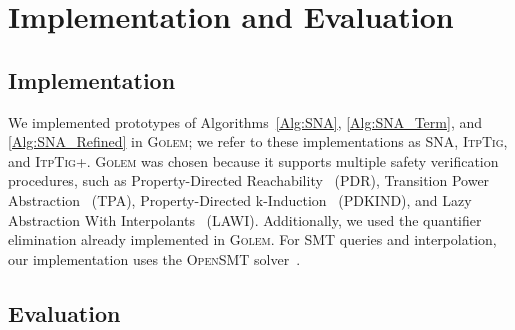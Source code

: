 \section{Implementation and Evaluation}
\label{Sec:Eval}


\newcommand{\golem}{\textsc{Golem}\xspace}
\newcommand{\opensmt}{\textsc{OpenSMT}\xspace}
\newcommand{\sna}{\textsc{SNA}\xspace}
\newcommand{\snaTerm}{\textsc{ItpTig}\xspace}
\newcommand{\snaOpt}{\textsc{ItpTig+}\xspace}
\newcommand{\LoAT}{\textsc{LoAT}\xspace}
\newcommand{\KoAT}{\textsc{KoAT}\xspace}
\newcommand{\Tt}{\textsc{T2}\xspace}

\subsection{Implementation}


We implemented prototypes of Algorithms~\ref{Alg:SNA}, \ref{Alg:SNA_Term}, and \ref{Alg:SNA_Refined} in \golem;
we refer to these implementations as \sna, \snaTerm, and \snaOpt.
\golem was chosen because it supports multiple safety verification procedures,
such as Property-Directed Reachability~\cite{DBLP:journals/fac/BradleyM08} (PDR), Transition Power Abstraction~\cite{DBLP:conf/tacas/BlichaFHS22} (TPA),
Property-Directed k-Induction~\cite{DBLP:conf/fmcad/JovanovicD16} (PDKIND), and Lazy Abstraction With Interpolants~\cite{DBLP:conf/cav/McMillan06} (LAWI).
Additionally, we used the quantifier elimination already implemented in \golem.
%
For SMT queries and interpolation, our implementation uses the \opensmt solver~\cite{DBLP:conf/sat/HyvarinenMAS16,DBLP:conf/tacas/BruttomessoPST10}.


\subsection{Evaluation}


